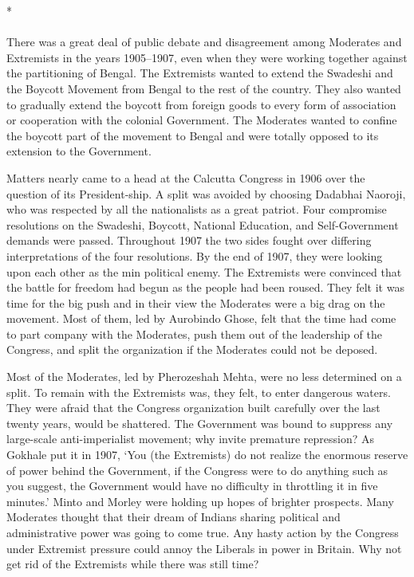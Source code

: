 \begin{multicols}{2}
\begin{center}*\end{center}

\paragraph*{}

There was a great deal of public debate and disagreement among Moderates and Extremists in the years 1905--1907, even when they were working together against the partitioning of Bengal. The Extremists wanted to extend the Swadeshi and the Boycott Movement from Bengal to the rest of the country. They also wanted to gradually extend the boycott from foreign goods to every form of association or cooperation with the colonial Government. The Moderates wanted to confine the boycott part of the movement to Bengal and were totally opposed to its extension to the Government.

Matters nearly came to a head at the Calcutta Congress in 1906 over the question of its President-ship. A split was avoided by choosing Dadabhai Naoroji, who was respected by all the nationalists as a great patriot. Four compromise resolutions on the Swadeshi, Boycott, National Education, and Self-Government demands were passed. Throughout 1907 the two sides fought over differing interpretations of the four resolutions. By the end of 1907, they were looking upon each other as the min political enemy. The Extremists were convinced that the battle for freedom had begun as the people had been roused. They felt it was time for the big push and in their view the Moderates were a big drag on the movement. Most of them, led by Aurobindo Ghose, felt that the time had come to part company with the Moderates, push them out of the leadership of the Congress, and split the organization if the Moderates could not be deposed.

Most of the Moderates, led by Pherozeshah Mehta, were no less determined on a split. To remain with the Extremists was, they felt, to enter dangerous waters. They were afraid that the Congress organization built carefully over the last twenty years, would be shattered. The Government was bound to suppress any large-scale anti-imperialist movement; why invite premature repression? As Gokhale put it in 1907, `You (the Extremists) do not realize the enormous reserve of power behind the Government, if the Congress were to do anything such as you suggest, the Government would have no difficulty in throttling it in five minutes.' Minto and Morley were holding up hopes of brighter prospects. Many Moderates thought that their dream of Indians sharing political and administrative power was going to come true. Any hasty action by the Congress under Extremist pressure could annoy the Liberals in power in Britain. Why not get rid of the Extremists while there was still time?


\end{multicols}

